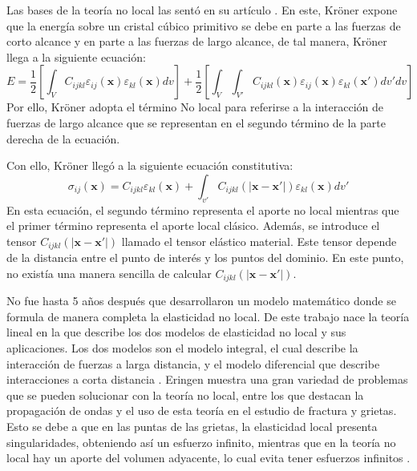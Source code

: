 \documentclass{article}
\begin{document}
Las bases de la teoría no local las sentó \textcite{Kroner1967} en su artículo \textit{}. En este, Kröner expone que la energía sobre un cristal cúbico primitivo se debe en parte a las fuerzas de corto alcance y en parte a las fuerzas de largo alcance, de tal manera, Kröner llega a la siguiente ecuación:
\begin{equation}
	E=\frac{1}{2}\left[\int_{V}C_{ijkl}\varepsilon_{ij}(\boldsymbol{x})\varepsilon_{kl}(\boldsymbol{x})dv\right]+\frac{1}{2}\left[\int_{V}\int_{V'}C_{ijkl}(\boldsymbol{x})\varepsilon_{ij}(\boldsymbol{x})\varepsilon_{kl}(\boldsymbol{x'})dv'dv\right]
\end{equation}
Por ello, Kröner adopta el término No local para referirse a la interacción de fuerzas de largo alcance que se representan en el segundo término de la parte derecha de la ecuación.

Con ello, Kröner llegó a la siguiente ecuación constitutiva:
\begin{equation}
	\sigma_{ij}(\boldsymbol{x})=C_{ijkl}\varepsilon_{kl}(\boldsymbol{x})+\int_{v'}C_{ijkl}(|\boldsymbol{x}-\boldsymbol{x'}|)\varepsilon_{kl}(\boldsymbol{x})dv'
\end{equation}
En esta ecuación, el segundo término representa el aporte no local mientras que el primer término representa el aporte local clásico. Además, se introduce el tensor $C_{ijkl}(|\boldsymbol{x}-\boldsymbol{x'}|)$ llamado el tensor elástico material. Este tensor depende de la distancia entre el punto de interés y los puntos del dominio. En este punto, no existía una manera sencilla de calcular $C_{ijkl}(|\boldsymbol{x}-\boldsymbol{x'}|)$.

No fue hasta 5 años después que \textcite{Eringen1972} desarrollaron un modelo matemático donde se formula de manera completa la elasticidad no local. De este trabajo nace la teoría lineal en la que \textcite{Eringen1987} describe los dos modelos de elasticidad no local y sus aplicaciones. Los dos modelos son el modelo integral, el cual describe la interacción de fuerzas a larga distancia, y el modelo diferencial que describe interacciones a corta distancia \parencite{Polizzotto2001}. Eringen muestra una gran variedad de problemas que se pueden solucionar con la teoría no local, entre los que destacan la propagación de ondas y el uso de esta teoría en el estudio de fractura y grietas. Esto se debe a que en las puntas de las grietas, la elasticidad local presenta singularidades, obteniendo así un esfuerzo infinito, mientras que en la teoría no local hay un aporte del volumen adyacente, lo cual evita tener esfuerzos infinitos \parencite{Eringen1987}.
\end{document}
